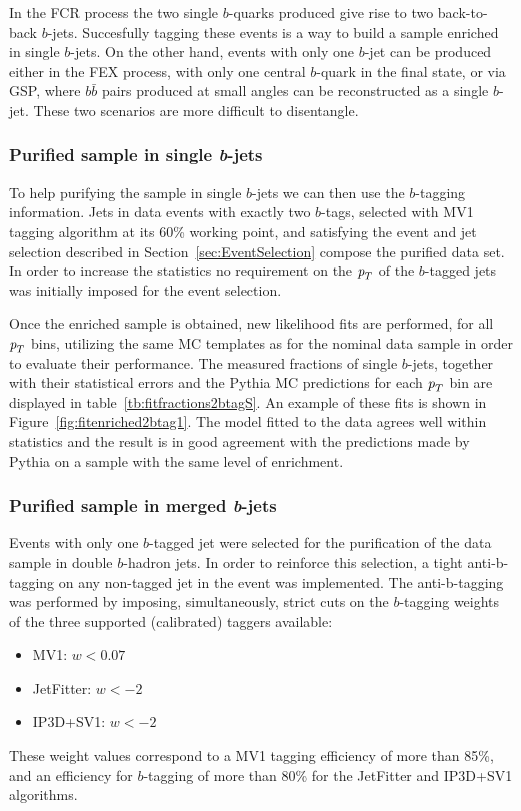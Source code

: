 In the FCR process the two single $b$-quarks produced give rise to two back-to-back $b$-jets. Succesfully tagging these events is a way to build a sample enriched in single $b$-jets.  On the other hand, events with only one $b$-jet can be produced either in the FEX process, with only one central $b$-quark in the final state, or via GSP, where $b\bar{b}$ pairs produced at small angles can be reconstructed as a single $b$-jet. These two scenarios are more difficult to disentangle. %

\subsubsection{Purified sample in single {\em b}-jets}

To help purifying the sample in single $b$-jets we can then use the $b$-tagging information. Jets in data events with exactly two $b$-tags, selected with MV1 tagging algorithm at its 60\% working point, and satisfying the event and jet selection described in Section~\ref{sec:EventSelection} compose the purified data set.  In order to increase the statistics no requirement on the ${\emph{p}_{T}}$ of the $b$-tagged jets was initially imposed for the event selection. 

Once the enriched sample is obtained, new likelihood fits are performed, for all ${\emph{p}_{T}}$ bins, utilizing the same MC templates as for the nominal data sample in order to evaluate their performance.  
The measured fractions of single $b$-jets, together with their statistical errors and the {\sc Pythia} MC predictions for each ${\emph{p}_{T}}$ bin are displayed in table~\ref{tb:fitfractions2btagS}. An example of these fits is shown  in  Figure~\ref{fig:fitenriched2btag1}. %
 The model fitted to the data agrees well within statistics and the result is in good agreement with the predictions made by {\sc Pythia} on a sample with the same level of enrichment.  

\subsubsection{Purified sample in merged {\em b}-jets}

Events with only one $b$-tagged jet were selected for the purification of the data sample in double $b$-hadron jets.  In order to reinforce this selection, a tight anti-b-tagging on any non-tagged jet in the event was implemented.  The anti-b-tagging was performed by imposing, simultaneously, strict cuts on the $b$-tagging weights of the three supported (calibrated) taggers available:
%
\begin{itemize}
\item
MV1:  $w < 0.07$  
\item
JetFitter:  $w < -2$
\item
IP3D+SV1:  $w < -2$
\end{itemize}
%
These weight values correspond to a MV1 tagging efficiency of more than 85\%, and an efficiency for $b$-tagging of more than 80\% for the JetFitter and IP3D+SV1 algorithms. 

